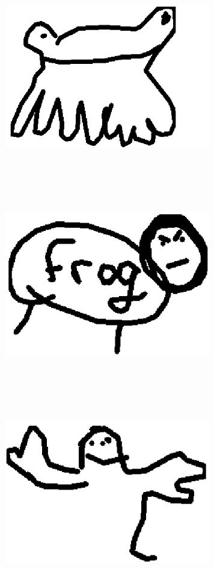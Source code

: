 \vspace{4mm}
\begin{center}
\includegraphics[width=9cm,height=9cm,keepaspectratio]{figures/frog_draw_1.png}
\includegraphics[width=9cm,height=9cm,keepaspectratio]{figures/frog_draw_2.png}
\includegraphics[width=9cm,height=9cm,keepaspectratio]{figures/frog_draw_3.png}

\end{center}
